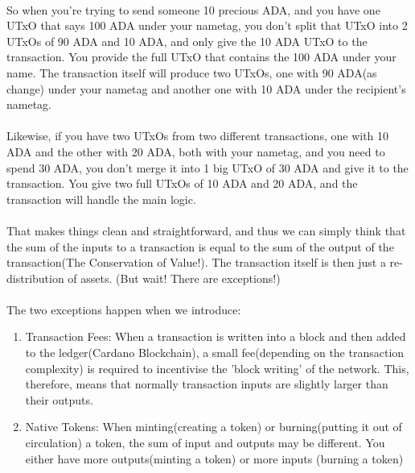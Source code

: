 \documentclass[a4paper, 11pt]{article}
\begin{document}
    \paragraph{}So when you're trying to send someone 10 precious ADA, and you have one UTxO that says 100 ADA under your nametag, you don't split that UTxO into 2 UTxOs of 90 ADA and 10 ADA, and only give the 10 ADA UTxO to the transaction. You provide the full UTxO that contains the 100 ADA under your name. The transaction itself will produce two UTxOs, one with 90 ADA(as change) under your nametag and another one with 10 ADA under the recipient's nametag.

    \paragraph{} Likewise, if you have two UTxOs from two different transactions, one with 10 ADA and the other with 20 ADA, both with your nametag, and you need to spend 30 ADA, you don't merge it into 1 big UTxO of 30 ADA and give it to the transaction. You give two full UTxOs of 10 ADA and 20 ADA, and the transaction will handle the main logic.

    \paragraph{} That makes things clean and straightforward, and thus we can simply think that the sum of the inputs to a transaction is equal to the sum of the output of the transaction(The Conservation of Value!).  The transaction itself is then just a re-distribution of assets. (But wait! There are exceptions!)

    \paragraph{} The two exceptions happen when we introduce: 
    
    \begin{enumerate}
        \item Transaction Fees: When a transaction is written into a block and then added to the ledger(Cardano Blockchain), a small fee(depending on the transaction complexity) is required to incentivise the 'block writing' of the network. This, therefore, means that normally transaction inputs are slightly larger than their outputs.
        \item Native Tokens: When minting(creating a token) or burning(putting it out of circulation) a token, the sum of input and outputs may be different. You either have more outputs(minting a token) or more inputs (burning a token)
    \end{enumerate}
\end{document}
